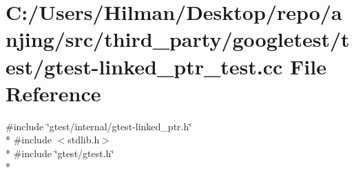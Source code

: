 \hypertarget{gtest-linked__ptr__test_8cc}{}\section{C\+:/\+Users/\+Hilman/\+Desktop/repo/anjing/src/third\+\_\+party/googletest/test/gtest-\/linked\+\_\+ptr\+\_\+test.cc File Reference}
\label{gtest-linked__ptr__test_8cc}
{\ttfamily \#include \char`\"{}gtest/internal/gtest-\/linked\+\_\+ptr.\+h\char`\"{}}\\*
{\ttfamily \#include $<$stdlib.\+h$>$}\\*
{\ttfamily \#include \char`\"{}gtest/gtest.\+h\char`\"{}}\\*
